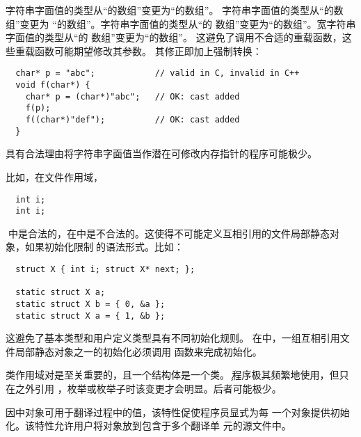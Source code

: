 字符串字面值的类型从“的数组”变更为“的数组”。
字符串字面值的类型从“的数组”变更为
“的数组”。字符串字面值的类型从“的
数组”变更为“的数组”。宽字符串字面值的类型从“的
数组”变更为“的数组”。
\diffrat 这避免了调用不合适的重载函数，这些重载函数可能期望修改其参数。
\diffeff \semchg
\diffdiff \syntrans 其修正即加上强制转换：
\begin{lstlisting}
  char* p = "abc";            // valid in C, invalid in C++
  void f(char*) {
    char* p = (char*)"abc";   // OK: cast added
    f(p);
    f((char*)"def");          // OK: cast added
  }
\end{lstlisting}
\diffuse 具有合法理由将字符串字面值当作潜在可修改内存指针的程序可能极少。


比如，在文件作用域，
\begin{lstlisting}
  int i;
  int i;
\end{lstlisting}
在\c{}中是合法的，在\cpp{}中是不合法的。这使得不可能定义互相引用的文件局部静态对
象，如果初始化限制为\c{}的语法形式。比如：
\begin{lstlisting}
  struct X { int i; struct X* next; };

  static struct X a;
  static struct X b = { 0, &a };
  static struct X a = { 1, &b };
\end{lstlisting}
\diffrat 这避免了基本类型和用户定义类型具有不同初始化规则。
\diffeff \semdel
\diffdiff \semtrans 在\cpp{}中，一组互相引用文件局部静态对象之一的初始化必须调用
函数来完成初始化。
\diffuse \seldom

\diffrat 类作用域对\cpp{}是至关重要的，且一个结构体是一个类。
\diffeff \semchg
\diffdiff \semtrans
\diffuse \c{}程序极其频繁地使用，但只在之外引用
，枚举或枚举子时该变更才会明显。后者可能极少。

\diffrat 因\cpp{}中对象可用于翻译过程中的值，该特性促使程序员显式为每
一个对象提供初始化。该特性允许用户将对象放到包含于多个翻译单
元的源文件中。
\diffeff \semchg
\diffdiff \semtrans
\diffuse \seldom

